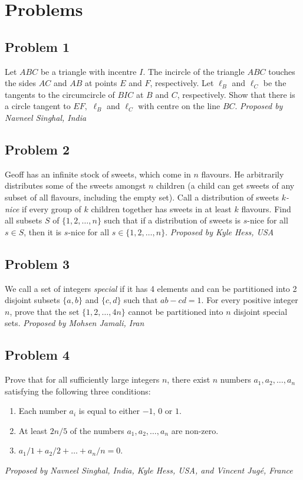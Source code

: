 \section{Problems}
\subsection*{Problem 1}
Let $ABC$ be a triangle with incentre $I$. The incircle of the triangle $ABC$ touches the sides $AC$ and $AB$ at points $E$ and $F$, respectively. Let $\ell_B$ and  $\ell_C$ be the tangents to the circumcircle of $BIC$ at $B$ and $C$, respectively. Show that there is a circle tangent to $EF,$ $\ell_B$ and $\ell_C$ with centre on the line $BC$.\nl
\textit{Proposed by Navneel Singhal, India}
\subsection*{Problem 2}
Geoff has an infinite stock of sweets, which come in $n$ flavours. He arbitrarily distributes some of the sweets amongst $n$ children (a child can get sweets of any subset of all flavours, including the empty set). Call a distribution of sweets $k$\emph{-nice} if every group of $k$ children together has sweets in at least $k$ flavours. Find all subsets $S$ of $\{1,2,\dots,n\}$ such that if a distribution of sweets is $s$-nice for all $s\in S$, then it is $s$-nice for all $s\in \{1,2,\dots,n\}$.\nl
\textit{Proposed by Kyle Hess, USA}
\subsection*{Problem 3}
We call a set of integers \textit{special} if it has 4 elements and can be partitioned into 2 disjoint subsets $\{a,b\}$ and $\{c,d\}$ such that $ab-cd=1$. For every positive integer $n$, prove that the set $\{1,2, \ldots , 4n\}$ cannot be partitioned into $n$ disjoint special sets.\nl
\textit{Proposed by Mohsen Jamali, Iran}
\subsection*{Problem 4}
Prove that for all sufficiently large integers $n$, there exist $n$ numbers $a_1,a_2,\ldots,a_n$ satisfying the following three conditions:
\begin{enumerate}
\item Each number $a_i$ is equal to either $-1$, $0$ or $1$.
\item At least $2n/5$ of the numbers  $a_1,a_2,\ldots, a_n$ are non-zero.
\item $a_1/1+a_2/2+\ldots+a_n/n=0$.
\end{enumerate}
\textit{Proposed by Navneel Singhal, India, Kyle Hess, USA, and Vincent Jugé, France}
